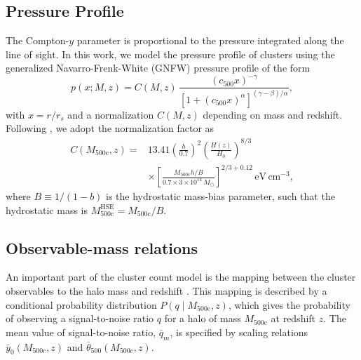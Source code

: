 \documentclass[aps,prd,twocolumn,superscriptaddress,nofootinbib,floatfix]{revtex4-2}
\begin{document}
\subsection{Pressure Profile}
The Compton-$y$ parameter is proportional to the pressure integrated along the line of sight. In this work, we model the pressure profile of clusters using the generalized Navarro-Frenk-White (GNFW) pressure profile of the form
\begin{equation}
    p(x;M,z) = C(M,z) \,
    \frac{(c_{500}x)^{-\gamma}}
    {\left[1 + (c_{500}x)^\alpha\right]^{(\gamma-\beta)/\alpha}},
    \label{eq:gnfw}
\end{equation}
with $x = r/r_s$ and a normalization $C(M,z)$ depending on mass and redshift. Following \citet{Arnaud2010}, we adopt the normalization factor as
\begin{align}
    C(M_{500\mathrm{c}},z)
    ={}& 13.41
    \left(\frac{h}{0.7}\right)^2
    \left(\frac{H(z)}{H_0}\right)^{8/3}
    \nonumber\\
    &\times
    \left[
        \frac{M_{500\mathrm{c}}h/B}
        {0.7\times 3\times10^{14}\,M_\odot}
    \right]^{2/3+0.12}
    \,\mathrm{eV\,cm^{-3}},
    \label{eq:pressure_normalisation}
\end{align}
where $B\equiv 1/(1-b)$ is the hydrostatic mass-bias parameter,
such that the hydrostatic mass is
$M_{500\mathrm{c}}^{\mathrm{HSE}}=M_{500\mathrm{c}}/B$.

\subsection{Observable-mass relations}
\label{subsec:obs-massrelations}
An important part of the cluster count model is the mapping between the cluster observables to the halo mass and redshift \citep{Planck2015XXIV,ZubeldiaBolliet2024}. This mapping is described by a conditional probability distribution $P(q\mid M_{500\mathrm{c}},z)$, which gives the probability of observing
a signal-to-noise ratio $q$ for a halo of mass $M_{500\mathrm{c}}$ at
redshift $z$. The mean value of signal-to-noise ratio, $\bar{q}_m$, is specified by scaling relations $\bar{y}_0(M_{500c},z)$ and $\bar{\theta}_{500}(M_{500c},z)$.
\end{document}
